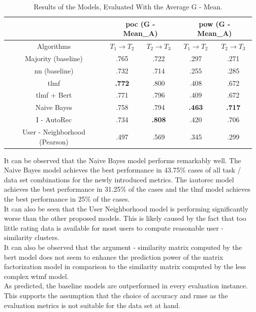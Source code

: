 \begin{table}[h!]
    \centering
    \begin{tabular}{|c|c|c|c|c|}
    \hline
     & \multicolumn{2}{|c|}{\acrshort{poc} (G - Mean_A)} & \multicolumn{2}{|c|}{\acrshort{pow} (G - Mean_A)} \\
     \hline
    Algorithms & $T_1 \to T_2$ & $T_2 \to T_3$ & $T_1 \to T_2$ & $T_2 \to T_3$\\
    \hline  Majority (baseline) & .765 & .722 & .297 & .271 \\ 
    \acrshort{nn} (baseline) & .732 & .714 & .255 & .285\\
    \acrshort{tlmf} & \textbf{.772} & .800 & .408 & .672 \\
    \acrshort{tlmf} + Bert & .771 & .796 & .409 & .672\\
    Naive Bayes & .758 & .794 & \textbf{.463} & \textbf{.717} \\
    I - AutoRec & .734 & \textbf{.808} & .420 & .706\\
    User - Neighborhood (Pearson) & .497 & .569 & .345 & .299\\
    \hline
    \end{tabular}
    \caption{Results of the Models, Evaluated With the Average G - Mean.}
    \label{tab:results_g_mean}
\end{table}
\noindent It can be observed that the Naive Bayes model performs remarkably well. The Naive Bayes model achieves the best performance in 43.75\% cases of all task / data set combinations for the newly introduced metrics. The \acrshort{iautorec} model achieves the best performance in 31.25\% of the cases and the \acrshort{tlmf} model achieves the best performance in 25\% of the cases.\\ It can also be seen that the User Neighborhood model is performing significantly worse than the other proposed models. This is likely caused by the fact that too little rating data is available for most users to compute reasonable user - similarity clusters.\\
It can also be observed that the argument - similarity matrix computed by the \acrshort{bert} model does not seem to enhance the prediction power of the matrix factorization model in comparison to the similarity matrix computed by the less complex \acrshort{wtmf} model.\\
As predicted, the baseline models are outperformed in every evaluation instance. This supports the assumption that the choice of accuracy and \acrshort{rmse} as the evaluation metrics is not suitable for the data set at hand.\\
